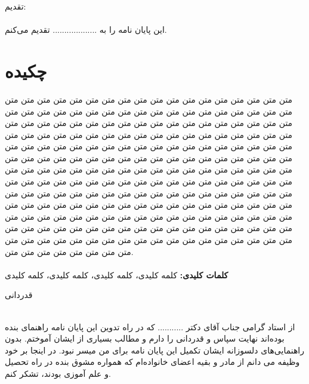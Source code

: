 \documentclass[a4paper,oneside]{book}
\begin{document}

  
 


\newpage
	

	\newpage
	\huge{تقدیم:}\\
	\hfill\\
	\large{این پایان نامه را به ................... تقدیم می‌کنم.}

	
	

	
	
	
	

\chapter*{چکیده}
متن متن متن متن متن متن متن متن متن متن متن متن متن متن متن متن متن متن متن متن متن متن متن متن متن متن متن متن متن متن متن متن متن متن متن متن متن متن متن متن متن متن متن متن متن متن متن متن متن متن متن متن متن متن متن متن متن متن متن متن متن متن متن متن متن متن متن متن متن متن متن متن متن متن متن متن متن متن متن متن متن متن متن متن متن متن متن متن متن متن متن متن متن متن متن متن متن متن متن متن متن متن متن متن متن متن متن متن متن متن متن متن متن متن متن متن متن متن متن متن متن متن متن متن متن متن متن متن متن متن متن متن متن متن متن متن متن متن متن متن متن متن متن متن متن متن متن متن متن متن متن متن متن متن متن متن متن متن متن متن متن متن متن متن متن متن متن متن متن متن متن متن متن متن متن متن متن متن متن متن متن متن متن متن متن متن متن متن متن متن متن متن متن متن متن متن متن متن متن متن متن متن متن متن متن متن متن متن متن متن متن متن متن متن متن متن متن متن متن متن متن متن متن متن متن متن متن متن متن متن متن متن متن متن متن متن متن متن متن متن متن متن.\\\\
\textbf{کلمات کلیدی:}
کلمه کلیدی، کلمه کلیدی، کلمه کلیدی، کلمه کلیدی
	
	
	
	
	
\newpage
\begin{center}
		{\LARGE قدردانی}\\
		\hfill\\
		
\end{center}
	از استاد گرامی جناب آقای دکتر ........... که در راه تدوین این پایان نامه راهنمای بنده بوده‌اند نهایت سپاس و قدردانی را دارم و مطالب بسیاری از ایشان آموختم. بدون راهنمایی‌های دلسوزانه ایشان تکمیل این پایان نامه برای من میسر نبود.
	در اینجا بر خود وظیفه می دانم از مادر و بقیه اعضای خانواده‌ام که همواره مشوق بنده در راه تحصیل و علم آموزی بودند، تشکر کنم.\\
	
\end{document}
